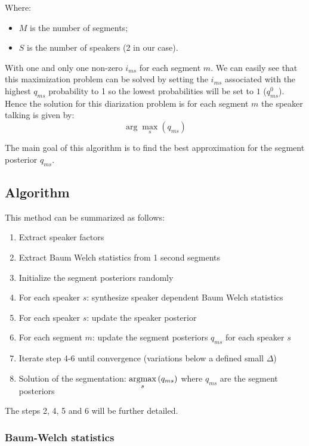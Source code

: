 \documentclass{techrep} %
\begin{document}
Where:
\begin{itemize}
\item $M$ is the number of segments;
\item $S$ is the number of speakers (2 in our case).
\end{itemize}

With one and only one non-zero $i_{ms}$ for each segment $m$.  We can
easily see that this maximization problem can be solved by setting the
$i_{ms}$ associated with the highest $q_{ms}$ probability to 1 so the
lowest probabilities will be set to $1$ ($q_{ms}^0$). Hence the solution for this
diarization problem is for each segment $m$ the speaker talking is
given by:
\begin{equation}\label{eq6}
  \arg\max_{s}(q_{ms})
\end{equation}

The main goal of this algorithm is to find the best approximation for
the segment posterior $q_{ms}$.

\subsection{Algorithm}

\newcommand{\argmax}[1]{\smash{\mathop{{\rm argmax}}\limits_{s}}\, #1}

This method can be summarized as follows:
\begin{enumerate}
\item Extract speaker factors
\item Extract Baum Welch statistics from 1 second segments %
\item Initialize the segment posteriors randomly
\item For each speaker $s$: synthesize speaker dependent Baum Welch statistics
\item For each speaker $s$: update the speaker posterior
\item For each segment $m$: update the segment posteriors $q_{ms}$ for each
  speaker $s$
\item Iterate step 4-6 until convergence (variations below a defined small $\Delta$)
\item Solution of the segmentation: $\argmax(q_{ms})$ where $q_{ms}$ are the segment posteriors
\end{enumerate}

The steps 2, 4, 5 and 6 will be further detailed.

\subsubsection{Baum-Welch statistics}
\end{document}
